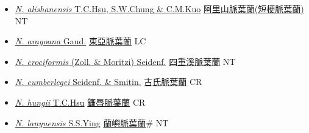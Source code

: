 \begin{itemize}
  \begin{itemize}
        \item[] \href{http://www.theplantlist.org/tpl1.1/search?q=Nervilia+alishanensis}{\textit{N. alishanensis} T.C.Hsu, S.W.Chung \& C.M.Kuo}     \href{\detokenize{http://taibnet.sinica.edu.tw/chi/taibnet_species_list.php?T2=阿里山脈葉蘭&T2_new_value=true&fr=y}}{阿里山脈葉蘭(短梗脈葉蘭)}   NT
        \item[] \href{http://www.theplantlist.org/tpl1.1/search?q=Nervilia+aragoana}{\textit{N. aragoana} Gaud.}   \href{\detokenize{http://taibnet.sinica.edu.tw/chi/taibnet_species_list.php?T2=東亞脈葉蘭&T2_new_value=true&fr=y}}{東亞脈葉蘭} LC
        \item[] \href{http://www.theplantlist.org/tpl1.1/search?q=Nervilia+crociformis}{\textit{N. crociformis} (Zoll. \& Moritzi) Seidenf.}   \href{\detokenize{http://taibnet.sinica.edu.tw/chi/taibnet_species_list.php?T2=四重溪脈葉蘭&T2_new_value=true&fr=y}}{四重溪脈葉蘭} NT
        \item[] \href{http://www.theplantlist.org/tpl1.1/search?q=Nervilia+cumberlegei}{\textit{N. cumberlegei} Seidenf. \& Smitin.}   \href{\detokenize{http://taibnet.sinica.edu.tw/chi/taibnet_species_list.php?T2=古氏脈葉蘭&T2_new_value=true&fr=y}}{古氏脈葉蘭} CR
        \item[] \href{http://www.theplantlist.org/tpl1.1/search?q=Nervilia+hungii}{\textit{N. hungii} T.C.Hsu}   \href{\detokenize{http://taibnet.sinica.edu.tw/chi/taibnet_species_list.php?T2=鐮唇脈葉蘭&T2_new_value=true&fr=y}}{鐮唇脈葉蘭} CR
        \item[] \href{http://www.theplantlist.org/tpl1.1/search?q=Nervilia+lanyuensis}{\textit{N. lanyuensis} S.S.Ying}   \href{\detokenize{http://taibnet.sinica.edu.tw/chi/taibnet_species_list.php?T2=蘭嶼脈葉蘭&T2_new_value=true&fr=y}}{蘭嶼脈葉蘭}\# NT

\end{itemize}
\end{itemize}

